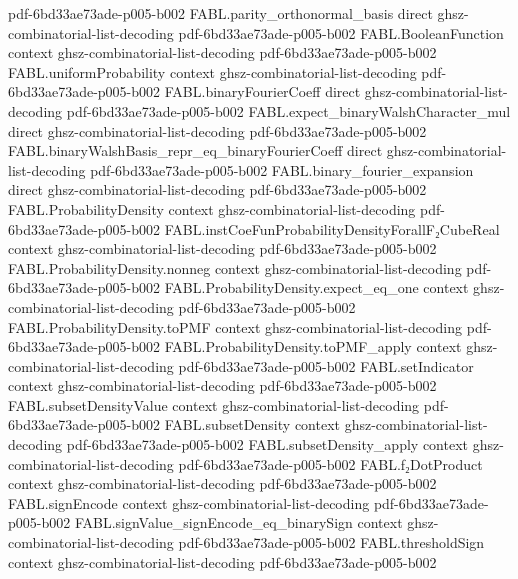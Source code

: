 \begin{theorem}
  {pdf-6bd33ae73ade-p005-b002}
\proofstep
  {FABL.parity_orthonormal_basis}
  {direct}
  {ghsz-combinatorial-list-decoding}
  {pdf-6bd33ae73ade-p005-b002}
\proofstep
  {FABL.BooleanFunction}
  {context}
  {ghsz-combinatorial-list-decoding}
  {pdf-6bd33ae73ade-p005-b002}
\proofstep
  {FABL.uniformProbability}
  {context}
  {ghsz-combinatorial-list-decoding}
  {pdf-6bd33ae73ade-p005-b002}
\proofstep
  {FABL.binaryFourierCoeff}
  {direct}
  {ghsz-combinatorial-list-decoding}
  {pdf-6bd33ae73ade-p005-b002}
\proofstep
  {FABL.expect_binaryWalshCharacter_mul}
  {direct}
  {ghsz-combinatorial-list-decoding}
  {pdf-6bd33ae73ade-p005-b002}
\proofstep
  {FABL.binaryWalshBasis_repr_eq_binaryFourierCoeff}
  {direct}
  {ghsz-combinatorial-list-decoding}
  {pdf-6bd33ae73ade-p005-b002}
\proofstep
  {FABL.binary_fourier_expansion}
  {direct}
  {ghsz-combinatorial-list-decoding}
  {pdf-6bd33ae73ade-p005-b002}
\proofstep
  {FABL.ProbabilityDensity}
  {context}
  {ghsz-combinatorial-list-decoding}
  {pdf-6bd33ae73ade-p005-b002}
\proofstep
  {FABL.instCoeFunProbabilityDensityForallF₂CubeReal}
  {context}
  {ghsz-combinatorial-list-decoding}
  {pdf-6bd33ae73ade-p005-b002}
\proofstep
  {FABL.ProbabilityDensity.nonneg}
  {context}
  {ghsz-combinatorial-list-decoding}
  {pdf-6bd33ae73ade-p005-b002}
\proofstep
  {FABL.ProbabilityDensity.expect_eq_one}
  {context}
  {ghsz-combinatorial-list-decoding}
  {pdf-6bd33ae73ade-p005-b002}
\proofstep
  {FABL.ProbabilityDensity.toPMF}
  {context}
  {ghsz-combinatorial-list-decoding}
  {pdf-6bd33ae73ade-p005-b002}
\proofstep
  {FABL.ProbabilityDensity.toPMF_apply}
  {context}
  {ghsz-combinatorial-list-decoding}
  {pdf-6bd33ae73ade-p005-b002}
\proofstep
  {FABL.setIndicator}
  {context}
  {ghsz-combinatorial-list-decoding}
  {pdf-6bd33ae73ade-p005-b002}
\proofstep
  {FABL.subsetDensityValue}
  {context}
  {ghsz-combinatorial-list-decoding}
  {pdf-6bd33ae73ade-p005-b002}
\proofstep
  {FABL.subsetDensity}
  {context}
  {ghsz-combinatorial-list-decoding}
  {pdf-6bd33ae73ade-p005-b002}
\proofstep
  {FABL.subsetDensity_apply}
  {context}
  {ghsz-combinatorial-list-decoding}
  {pdf-6bd33ae73ade-p005-b002}
\proofstep
  {FABL.f₂DotProduct}
  {context}
  {ghsz-combinatorial-list-decoding}
  {pdf-6bd33ae73ade-p005-b002}
\proofstep
  {FABL.signEncode}
  {context}
  {ghsz-combinatorial-list-decoding}
  {pdf-6bd33ae73ade-p005-b002}
\proofstep
  {FABL.signValue_signEncode_eq_binarySign}
  {context}
  {ghsz-combinatorial-list-decoding}
  {pdf-6bd33ae73ade-p005-b002}
\proofstep
  {FABL.thresholdSign}
  {context}
  {ghsz-combinatorial-list-decoding}
  {pdf-6bd33ae73ade-p005-b002}

\end{theorem}
